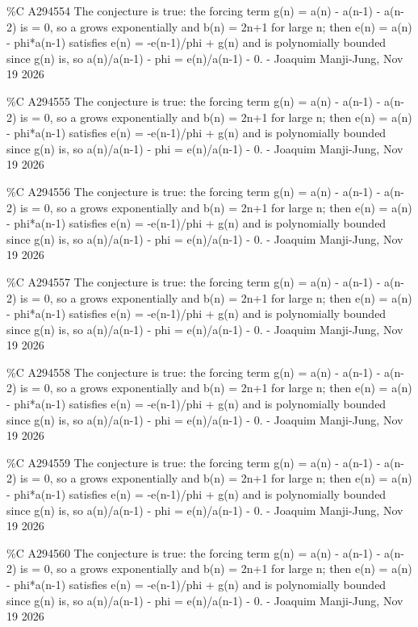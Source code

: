 {\%C A294554 The conjecture is true: the forcing term g(n) = a(n) - a(n-1) - a(n-2) is = 0, so a grows exponentially and b(n) = 2n+1 for large n; then e(n) = a(n) - phi*a(n-1) satisfies e(n) = -e(n-1)/phi + g(n) and is polynomially bounded since g(n) is, so a(n)/a(n-1) - phi = e(n)/a(n-1) - 0. - Joaquim Manji-Jung, Nov 19 2026\par
\%C A294555 The conjecture is true: the forcing term g(n) = a(n) - a(n-1) - a(n-2) is = 0, so a grows exponentially and b(n) = 2n+1 for large n; then e(n) = a(n) - phi*a(n-1) satisfies e(n) = -e(n-1)/phi + g(n) and is polynomially bounded since g(n) is, so a(n)/a(n-1) - phi = e(n)/a(n-1) - 0. - Joaquim Manji-Jung, Nov 19 2026\par
\%C A294556 The conjecture is true: the forcing term g(n) = a(n) - a(n-1) - a(n-2) is = 0, so a grows exponentially and b(n) = 2n+1 for large n; then e(n) = a(n) - phi*a(n-1) satisfies e(n) = -e(n-1)/phi + g(n) and is polynomially bounded since g(n) is, so a(n)/a(n-1) - phi = e(n)/a(n-1) - 0. - Joaquim Manji-Jung, Nov 19 2026\par
\%C A294557 The conjecture is true: the forcing term g(n) = a(n) - a(n-1) - a(n-2) is = 0, so a grows exponentially and b(n) = 2n+1 for large n; then e(n) = a(n) - phi*a(n-1) satisfies e(n) = -e(n-1)/phi + g(n) and is polynomially bounded since g(n) is, so a(n)/a(n-1) - phi = e(n)/a(n-1) - 0. - Joaquim Manji-Jung, Nov 19 2026\par
\%C A294558 The conjecture is true: the forcing term g(n) = a(n) - a(n-1) - a(n-2) is = 0, so a grows exponentially and b(n) = 2n+1 for large n; then e(n) = a(n) - phi*a(n-1) satisfies e(n) = -e(n-1)/phi + g(n) and is polynomially bounded since g(n) is, so a(n)/a(n-1) - phi = e(n)/a(n-1) - 0. - Joaquim Manji-Jung, Nov 19 2026\par
\%C A294559 The conjecture is true: the forcing term g(n) = a(n) - a(n-1) - a(n-2) is = 0, so a grows exponentially and b(n) = 2n+1 for large n; then e(n) = a(n) - phi*a(n-1) satisfies e(n) = -e(n-1)/phi + g(n) and is polynomially bounded since g(n) is, so a(n)/a(n-1) - phi = e(n)/a(n-1) - 0. - Joaquim Manji-Jung, Nov 19 2026\par
\%C A294560 The conjecture is true: the forcing term g(n) = a(n) - a(n-1) - a(n-2) is = 0, so a grows exponentially and b(n) = 2n+1 for large n; then e(n) = a(n) - phi*a(n-1) satisfies e(n) = -e(n-1)/phi + g(n) and is polynomially bounded since g(n) is, so a(n)/a(n-1) - phi = e(n)/a(n-1) - 0. - Joaquim Manji-Jung, Nov 19 2026\par
}
